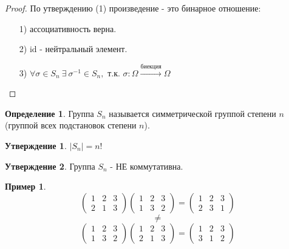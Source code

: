 \documentclass[a4paper, 12pt]{article}
\theoremstyle{definition}
\newtheorem*{definition}{Определение}
\newtheorem*{subtheorem}{Утверждение}
\newtheorem*{example1}{Пример}
\begin{document}
  \begin{proof}
    По утверждению (1) произведение - это бинарное отношение:
    \begin{itemize}
      \item[1)] ассоциативность верна.
      \item[2)] $\textrm{id}$ - нейтральный элемент.
      \item[3)] $\forall \sigma \in S_n \ \exists \ \sigma^{-1} \in S_n, $ т.к. $\sigma: \Omega \overset{\text{биекция}}{\longrightarrow} \Omega$  
    \end{itemize}
  \end{proof} 
  \begin{definition}
    Группа $S_n$ называется симметрической группой степени $n$ \\(группой всех подстановок степени $n$).
  \end{definition} 
  \begin{subtheorem}
    $|S_n| = n!$ 
  \end{subtheorem} 
  \begin{subtheorem}
    Группа $S_n$ - НЕ коммутативна.
  \end{subtheorem} 
  \begin{example1}
    $$\begin{pmatrix}
      1 & 2 & 3 \\ 2 & 1 & 3
    \end{pmatrix} \begin{pmatrix}
      1 & 2 & 3 \\ 1 & 3 & 2
    \end{pmatrix} = \begin{pmatrix}
      1 & 2 & 3 \\ 2 & 3 & 1
    \end{pmatrix}$$ 
    $$\neq$$ 
    $$\begin{pmatrix}
      1 & 2 & 3 \\ 1 & 3 & 2
    \end{pmatrix} \begin{pmatrix}
      1 & 2 & 3 \\ 2 & 1 & 3
    \end{pmatrix} = \begin{pmatrix}
      1 & 2 & 3 \\ 3 & 1 & 2
    \end{pmatrix}$$ 
  \end{example1}
\end{document}
